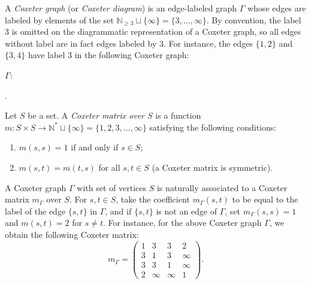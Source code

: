 \documentclass[A4paper, oneside]{amsart}
\theoremstyle{definition}
\begin{document}
A {\em Coxeter graph} (or {\em Coxeter diagram}) is  an edge-labeled graph $\Gamma$   whose edges are labeled by elements of the set $\mathbb N_{\geq 3}\sqcup\{\infty\}=\{3,\dots, \infty\}$. By convention, the label $3$ is omitted on the diagrammatic representation of a Coxeter graph, so all edges without label are in fact edges labeled by $3$. For instance, the edges $\{1,2\}$ and $\{3,4\}$ have label $3$ in the following Coxeter graph: 
\begin{center}
$\Gamma:$ \hskip 1cm
.
\end{center}

Let $S$ be a set. A {\em Coxeter matrix over $S$}  is a function  
$
m:S\times S \to \mathbb N^*\sqcup\{\infty\}=\{1,2,3,\dots, \infty\}
$  
satisfying the following conditions:
\begin{enumerate}[\itshape (i)]
\item $m(s,s)=1$ if and only if $s\in S$;
\item $m(s,t)=m(t,s)$ for all $s,t\in S$ (a Coxeter matrix is symmetric).
\end{enumerate}

A Coxeter graph $\Gamma$ with set of vertices $S$ is naturally associated to a Coxeter matrix $m_\Gamma$ over $S$. For $s,t\in S$, take the coefficient $m_\Gamma(s,t)$ to be equal to the label of the edge $\{s,t\}$ in $\Gamma$, and  if $\{s,t\}$ is not an edge of $\Gamma$, set  $m_\Gamma(s,s)=1$ and  $m(s,t)=2$ for $s\not = t$. For instance, for the above Coxeter graph $\Gamma$, we obtain the following Coxeter matrix:
$$
m_\Gamma=\begin{pmatrix}
1&3&3&2\\
3&1&3&\infty\\
3&3&1&\infty\\
2&\infty&\infty&1
\end{pmatrix}.
$$
\end{document}
